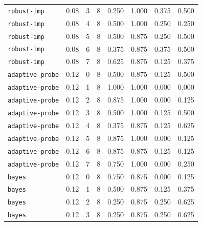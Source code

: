 \documentclass{article}
\begin{document}
\begin{center}
{\begin{tabular}{llllcccc}
\texttt{robust-imp} & 0.08 & 3 & 8 & 0.250 & 1.000 & 0.375 & 0.500 \\
\texttt{robust-imp} & 0.08 & 4 & 8 & 0.500 & 1.000 & 0.250 & 0.250 \\
\texttt{robust-imp} & 0.08 & 5 & 8 & 0.500 & 0.875 & 0.250 & 0.500 \\
\texttt{robust-imp} & 0.08 & 6 & 8 & 0.375 & 0.875 & 0.375 & 0.500 \\
\texttt{robust-imp} & 0.08 & 7 & 8 & 0.625 & 0.875 & 0.125 & 0.375 \\
\texttt{adaptive-probe} & 0.12 & 0 & 8 & 0.500 & 0.875 & 0.125 & 0.500 \\
\texttt{adaptive-probe} & 0.12 & 1 & 8 & 1.000 & 1.000 & 0.000 & 0.000 \\
\texttt{adaptive-probe} & 0.12 & 2 & 8 & 0.875 & 1.000 & 0.000 & 0.125 \\
\texttt{adaptive-probe} & 0.12 & 3 & 8 & 0.500 & 1.000 & 0.125 & 0.500 \\
\texttt{adaptive-probe} & 0.12 & 4 & 8 & 0.375 & 0.875 & 0.125 & 0.625 \\
\texttt{adaptive-probe} & 0.12 & 5 & 8 & 0.875 & 1.000 & 0.000 & 0.125 \\
\texttt{adaptive-probe} & 0.12 & 6 & 8 & 0.875 & 0.875 & 0.125 & 0.125 \\
\texttt{adaptive-probe} & 0.12 & 7 & 8 & 0.750 & 1.000 & 0.000 & 0.250 \\
\texttt{bayes} & 0.12 & 0 & 8 & 0.750 & 0.875 & 0.000 & 0.125 \\
\texttt{bayes} & 0.12 & 1 & 8 & 0.500 & 0.875 & 0.125 & 0.375 \\
\texttt{bayes} & 0.12 & 2 & 8 & 0.250 & 0.875 & 0.250 & 0.625 \\
\texttt{bayes} & 0.12 & 3 & 8 & 0.250 & 0.875 & 0.250 & 0.625 \\
\bottomrule
\end{tabular}%
}
\end{center}
\end{document}

